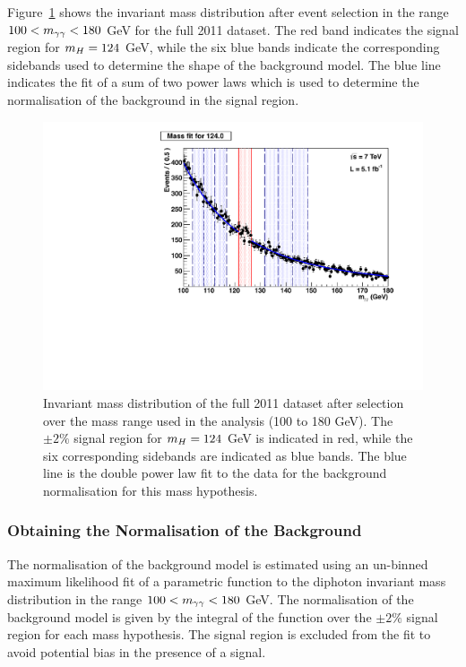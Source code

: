 Figure~\ref{fig:fullmassspec} shows the invariant mass distribution after event selection in the range 
$100 < m_{\gamma\gamma} < 180$ GeV for the full 2011 dataset. The red band indicates the signal region for
$m_{H}=124$ GeV, while the six blue bands indicate the corresponding sidebands used to determine the shape 
of the background model. 
The blue line indicates the fit of a sum of two power laws which is used to determine the normalisation of the
background in the signal region.

\begin{figure}
 \begin{center}
  \includegraphics[width=.8\textwidth]{hgg7TeV/sidebandMvaPlots/fits/massfit.pdf}
 \end{center}
 \caption{Invariant mass distribution of the full 2011 dataset after selection over the mass range used in
the analysis (100 to 180 GeV). The $\pm 2\%$ signal region for $m_{H}=124$ GeV is indicated in red, while the six
corresponding sidebands are indicated as blue bands. The blue line is the double power law fit to the data for 
the background normalisation for this mass hypothesis.}
 \label{fig:fullmassspec}
\end{figure}

\subsubsection{Obtaining the Normalisation of the Background}
\label{sec:backgroundnormalisation}

The normalisation of the background model is estimated using an un-binned maximum likelihood fit of
a parametric function to the diphoton invariant mass distribution in the range $100 < m_{\gamma\gamma} < 180$ GeV. 
The normalisation 
of the background model is given by the integral of the function over the $\pm2\%$ signal region
for each mass hypothesis. The  signal region is excluded from the fit to avoid potential bias in the 
presence of a signal.

